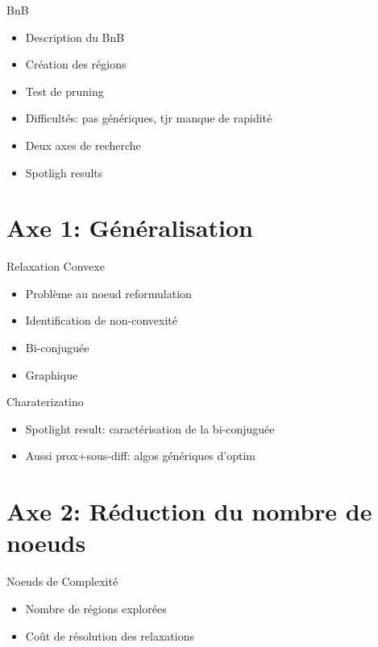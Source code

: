 \documentclass[10pt]{beamer}
\begin{document}
\begin{frame}{BnB}
  \begin{itemize}
    \item Description du BnB
    \item Création des régions
    \item Test de pruning
    \item Difficultés: pas génériques, tjr manque de rapidité
    \item Deux axes de recherche
    \item Spotligh results
  \end{itemize}
\end{frame}

\section{Axe 1: Généralisation}

\begin{frame}{Relaxation Convexe}
  \begin{itemize}
    \item Problème au noeud reformulation
    \item Identification de non-convexité
    \item Bi-conjuguée
    \item Graphique
  \end{itemize}
\end{frame}

\begin{frame}{Charaterizatino}
  \begin{itemize}
    \item Spotlight result: caractérisation de la bi-conjuguée
    \item Aussi prox+sous-diff: algos génériques d'optim
  \end{itemize}
\end{frame}

\section{Axe 2: Réduction du nombre de noeuds}

\begin{frame}{Noeuds de Complexité}
  \begin{itemize}
    \item Nombre de régions explorées
    \item Coût de résolution des relaxations
  \end{itemize}
\end{frame}
\end{document}
